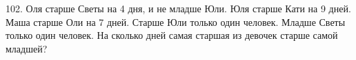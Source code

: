 102. Оля старше Светы на 4 дня, и не младше Юли. Юля старше Кати на 9 дней. Маша старше Оли на 7 дней. Старше Юли только один человек. Младше Светы только один человек. На сколько дней самая старшая из девочек старше самой младшей?\\

